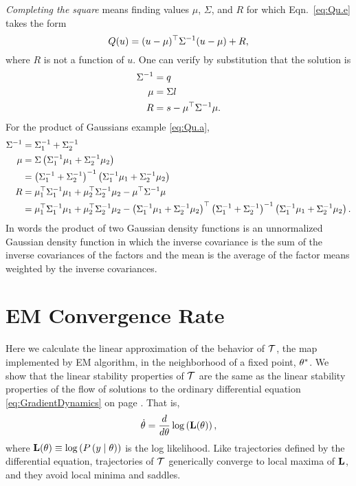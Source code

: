\emph{Completing the square} means finding values $\mu$, $\Sigma$, and
$R$ for which Eqn.~\eqref{eq:Qu.e} takes the form
\begin{equation*}
  Q(u) = (u - \mu)^\top \Sigma^{-1} (u - \mu) + R,
\end{equation*}
where $R$ is not a function of $u$.  One can verify by substitution
that the solution is
\begin{align*}
  \Sigma^{-1} &= q\\
  \mu &= \Sigma l\\
  R &= s -  \mu^\top \Sigma^{-1} \mu.
\end{align*}
For the product of Gaussians example \eqref{eq:Qu.a},
\begin{subequations}
  \label{eq:GaussianProduct}
  \begin{align}
  \Sigma^{-1} &= \Sigma_1^{-1} + \Sigma_2^{-1} \\
  \mu &= \Sigma \left( \Sigma_1^{-1} \mu_1 + \Sigma_2^{-1} \mu_2
  \right) \\
  &= \left( \Sigma_1^{-1} + \Sigma_2^{-1} \right)^{-1} \left(
  \Sigma_1^{-1} \mu_1 + \Sigma_2^{-1} \mu_2  \right) \\
  R &= \mu_1^\top \Sigma_1^{-1} \mu_1 + \mu_2^\top
  \Sigma_2^{-1} \mu_2 -  \mu^\top \Sigma^{-1} \mu \\
  &= \mu_1^\top \Sigma_1^{-1} \mu_1 + \mu_2^\top
  \Sigma_2^{-1} \mu_2 - \left( \Sigma_1^{-1} \mu_1 + \Sigma_2^{-1}
  \mu_2  \right) ^\top \left( \Sigma_1^{-1} + \Sigma_2^{-1}
  \right)^{-1} \left( \Sigma_1^{-1} \mu_1 + \Sigma_2^{-1} \mu_2
  \right).
\end{align}
\end{subequations}
In words the product of two Gaussian density functions is an
unnormalized Gaussian density function in which the inverse covariance
is the sum of the inverse covariances of the factors and the mean is
the average of the factor means weighted by the inverse covariances.

\chapter{EM Convergence Rate}
\label{chap:em_appendix}

\newcommand{\OldParameters}{\parameters}
\newcommand{\NewParameters}{\parameters'} Here we calculate the linear
approximation of the behavior of $\EMmap$, the map implemented by EM
algorithm, in the neighborhood of a fixed point, ${\theta^*}$.  We
show that the linear stability properties of $\EMmap$ are the same as
the linear stability properties of the flow of solutions to the
ordinary differential equation \eqref{eq:GradientDynamics} on page
\pageref{eq:GradientDynamics}.  That is,
\begin{equation*}
  \dot {\theta} = \frac{d}{d \theta} \log \left(
    {\bf L}(\theta) \right),
\end{equation*}
where ${\bf L}(\theta) \equiv \log \left( P \left( y \mid
    \theta \right) \right)$ is the log likelihood. Like trajectories
defined by the differential equation, trajectories of $\EMmap$
generically converge to local maxima of ${\bf L}$, and they
avoid local minima and saddles.

